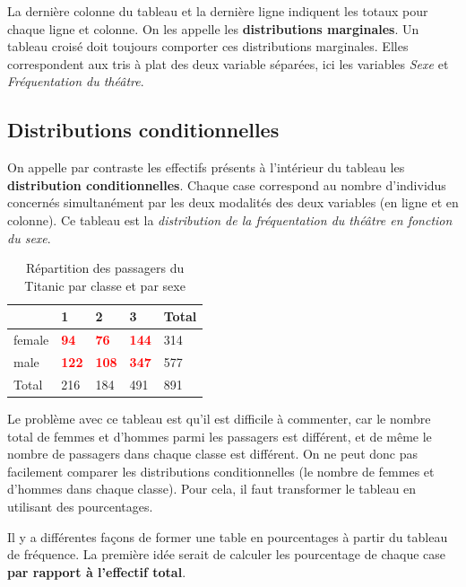 \documentclass[
  french,
]{book}
\begin{document}
La dernière colonne du tableau et la dernière ligne indiquent les totaux pour chaque ligne et colonne. On les appelle les \textbf{distributions marginales}. Un tableau croisé doit toujours comporter ces distributions marginales. Elles correspondent aux tris à plat des deux variable séparées, ici les variables \emph{Sexe} et \emph{Fréquentation du théâtre}.

\hypertarget{distributions-conditionnelles}{%
\subsection{Distributions conditionnelles}\label{distributions-conditionnelles}}

On appelle par contraste les effectifs présents à l'intérieur du tableau les \textbf{distribution conditionnelles}. Chaque case correspond au nombre d'individus concernés simultanément par les deux modalités des deux variables (en ligne et en colonne). Ce tableau est la \emph{distribution de la fréquentation du théâtre en fonction du sexe}.

\begin{table}

\caption{\label{tab:unnamed-chunk-16}Répartition des passagers du Titanic par classe et par sexe}
\centering
\begin{tabular}[t]{l|l|l|l|l}
\hline
  & 1 & 2 & 3 & Total\\
\hline
female & \textcolor{red}{\textbf{94}} & \textcolor{red}{\textbf{76}} & \textcolor{red}{\textbf{144}} & 314\\
\hline
male & \textcolor{red}{\textbf{122}} & \textcolor{red}{\textbf{108}} & \textcolor{red}{\textbf{347}} & 577\\
\hline
Total & 216 & 184 & 491 & 891\\
\hline
\end{tabular}
\end{table}

Le problème avec ce tableau est qu'il est difficile à commenter, car le nombre total de femmes et d'hommes parmi les passagers est différent, et de même le nombre de passagers dans chaque classe est différent. On ne peut donc pas facilement comparer les distributions conditionnelles (le nombre de femmes et d'hommes dans chaque classe). Pour cela, il faut transformer le tableau en utilisant des pourcentages.

Il y a différentes façons de former une table en pourcentages à partir du tableau de fréquence. La première idée serait de calculer les pourcentage de chaque case \textbf{par rapport à l'effectif total}.
\end{document}
